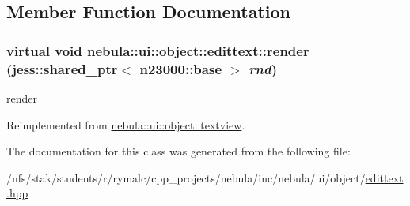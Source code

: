 \subsection{Member Function Documentation}
\hypertarget{classnebula_1_1ui_1_1object_1_1edittext_a824a31e2e8f8407a4cfb413b877c726c}{
\subsubsection[{render}]{\setlength{\rightskip}{0pt plus 5cm}virtual void nebula::ui::object::edittext::render (jess::shared\_\-ptr$<$ {\bf n23000::base} $>$ {\em rnd})}}
\label{classnebula_1_1ui_1_1object_1_1edittext_a824a31e2e8f8407a4cfb413b877c726c}


render 

Reimplemented from \hyperlink{classnebula_1_1ui_1_1object_1_1textview_af2b39e3d0d5b21d2195682826f483de7}{nebula::ui::object::textview}.

The documentation for this class was generated from the following file:\begin{DoxyCompactItemize}
\item 
/nfs/stak/students/r/rymalc/cpp\_\-projects/nebula/inc/nebula/ui/object/\hyperlink{edittext_8hpp}{edittext.hpp}\end{DoxyCompactItemize}
